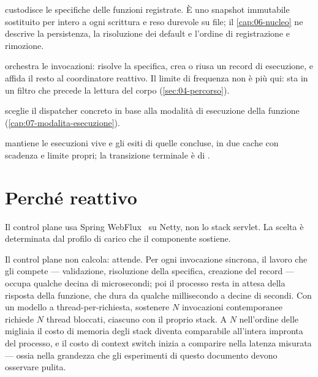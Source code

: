 \begin{description}[style=nextline, leftmargin=0pt]
  \item[\code{FunctionRegistry}] custodisce le specifiche delle funzioni
  registrate. \`E uno snapshot immutabile sostituito per intero a ogni scrittura
  e reso durevole su file; il \cref{cap:06-nucleo} ne descrive la
  persistenza, la risoluzione dei default e l'ordine di registrazione e
  rimozione.

  \item[\code{InvocationService}] orchestra le invocazioni: risolve la
  specifica, crea o riusa un record di esecuzione, e affida il resto al
  coordinatore reattivo. Il limite di frequenza non \`e pi\`u qui: sta in un
  filtro che precede la lettura del corpo (\cref{sec:04-percorso}).

  \item[\code{DispatcherRouter}] sceglie il dispatcher concreto in base alla
  modalit\`a di esecuzione della funzione (\cref{cap:07-modalita-esecuzione}).

  \item[\code{ExecutionStore}] mantiene le esecuzioni vive e gli esiti di quelle
  concluse, in due cache con scadenza e limite propri; la transizione terminale
  \`e di .
\end{description}

\section{Perch\'e reattivo}

Il control plane usa Spring WebFlux~\cite{springwebflux} su Netty, non lo stack
servlet. La scelta \`e determinata dal profilo di carico che il componente
sostiene.

Il control plane non calcola: attende. Per ogni invocazione sincrona, il lavoro
che gli compete --- validazione, risoluzione della specifica, creazione del
record --- occupa qualche decina di microsecondi; poi il processo resta in
attesa della risposta della funzione, che dura da qualche millisecondo a
decine di secondi. Con un modello a thread-per-richiesta, sostenere $N$
invocazioni contemporanee richiede $N$ thread bloccati, ciascuno con il proprio
stack. A $N$ nell'ordine delle migliaia il costo di memoria degli stack diventa
comparabile all'intera impronta del processo, e il costo di context switch
inizia a comparire nella latenza misurata --- ossia nella grandezza che gli
esperimenti di questo documento devono osservare pulita.

